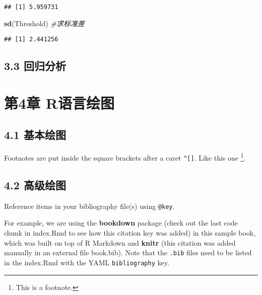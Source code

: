 \documentclass[
]{book}
\newenvironment{Shaded}{\begin{snugshade}}{\end{snugshade}}
\newcommand{\CommentTok}[1]{\textcolor[rgb]{0.56,0.35,0.01}{\textit{#1}}}
\newcommand{\FunctionTok}[1]{\textcolor[rgb]{0.13,0.29,0.53}{\textbf{#1}}}
\newcommand{\NormalTok}[1]{#1}
\theoremstyle{definition}
\theoremstyle{definition}
\theoremstyle{definition}
\theoremstyle{definition}
\theoremstyle{remark}
\begin{document}
\begin{verbatim}
## [1] 5.959731
\end{verbatim}

\begin{Shaded}
\begin{Highlighting}[]
\FunctionTok{sd}\NormalTok{(Threshold) }\CommentTok{\#求标准差}
\end{Highlighting}
\end{Shaded}

\begin{verbatim}
## [1] 2.441256
\end{verbatim}

\hypertarget{ux56deux5f52ux5206ux6790}{%
\section*{3.3 回归分析}\label{ux56deux5f52ux5206ux6790}}

\hypertarget{ux7b2c4ux7ae0-rux8bedux8a00ux7ed8ux56fe}{%
\chapter*{第4章 R语言绘图}\label{ux7b2c4ux7ae0-rux8bedux8a00ux7ed8ux56fe}}

\hypertarget{ux57faux672cux7ed8ux56fe}{%
\section*{4.1 基本绘图}\label{ux57faux672cux7ed8ux56fe}}

Footnotes are put inside the square brackets after a caret \texttt{\^{}{[}{]}}. Like this one \footnote{This is a footnote.}.

\hypertarget{ux9ad8ux7ea7ux7ed8ux56fe}{%
\section*{4.2 高级绘图}\label{ux9ad8ux7ea7ux7ed8ux56fe}}

Reference items in your bibliography file(s) using \texttt{@key}.

For example, we are using the \textbf{bookdown} package \citep{R-bookdown} (check out the last code chunk in index.Rmd to see how this citation key was added) in this sample book, which was built on top of R Markdown and \textbf{knitr} \citep{xie2015} (this citation was added manually in an external file book.bib).
Note that the \texttt{.bib} files need to be listed in the index.Rmd with the YAML \texttt{bibliography} key.
\end{document}
